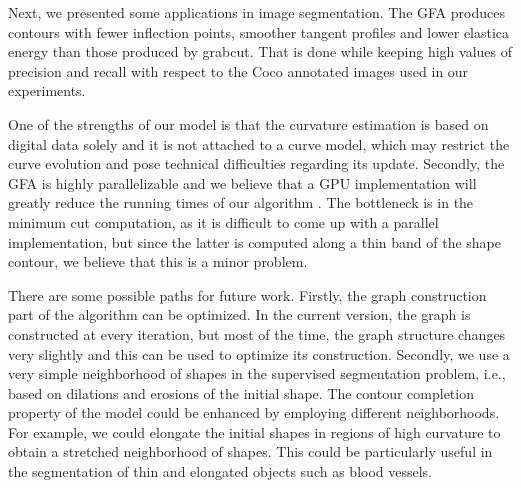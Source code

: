 \documentclass[review]{siamart220329}
\begin{document}
Next, we presented some applications in image
segmentation. The GFA produces contours with
fewer inflection points, smoother tangent profiles and lower elastica energy
than those produced by grabcut. That is done while
keeping high values of precision and recall with respect to the Coco annotated
images used in our experiments. 

One of the strengths of our model is that the curvature estimation is based on
digital data solely and it is not attached to a curve model, which may restrict
the curve evolution and pose technical difficulties regarding its update.
Secondly, the GFA is highly parallelizable and we believe
that a GPU implementation will greatly reduce the running times of our algorithm
. The bottleneck is in the
minimum cut computation, as it is difficult to come up with a parallel
implementation, but since the latter is computed along a thin band of the shape
contour, we believe that this is a minor problem.

There are some possible paths for future work. Firstly, the graph construction
part of the algorithm can be optimized. In the current version, the graph is
constructed at every iteration, but most of the time, the graph structure
changes very slightly and this can be used to optimize its construction.
Secondly, we use a very simple neighborhood of shapes in the supervised
segmentation problem, i.e., based on dilations and erosions of the initial
shape. The contour completion property of the model could be enhanced by
employing different neighborhoods. For example, we could elongate the initial
shapes in regions of high curvature to obtain a stretched neighborhood of
shapes. This could be particularly useful in the segmentation of thin and
elongated objects such as blood vessels.
%
%
%
%


\end{document}
